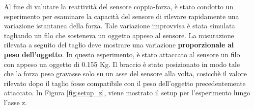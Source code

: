 Al fine di valutare la reattivit\`{a} del sensore coppia-forza, \`{e} stato condotto un esperimento per esaminare la capacit\`{a} del 
sensore di rilevare rapidamente una variazione istantanea della forza. 
Tale variazione improvvisa \`{e} stata simulata 
tagliando un filo che sosteneva un oggetto appeso al sensore. La misurazione rilevata a seguito del taglio  
deve mostrare una variazione \textbf{proporzionale al peso dell'oggetto}.
In questo esperimento, \`{e} stato attaccato al sensore un filo con appeso un oggetto di 0.155 Kg. 
Il braccio \`{e} stato posizionato in modo tale che la forza peso gravasse solo su un asse del sensore alla volta, cosicch\`{e} 
il valore rilevato dopo il taglio fosse compatibile con il peso dell'oggetto precedentemente attaccato. 
In Figura \ref{fig:setup_z}, viene mostrato il setup per l'esperimento lungo l'asse z. 
\newpage

